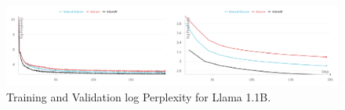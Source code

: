\begin{figure}[ht]
    \centering
    \includegraphics[width=\linewidth]{figures/train_and_validate_llama1_1B.pdf}
    \vspace{-4.5mm}
    \caption{\small{Training and Validation log Perplexity for Llama 1.1B.
    }}
    \vspace{-4mm}
    \label{fig:train_loss}
\end{figure}